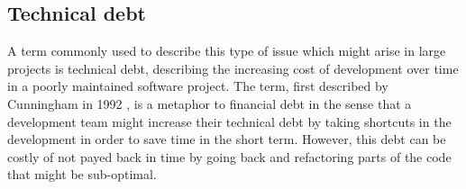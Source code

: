 \subsection{Technical debt}
A term commonly used to describe this type of issue which might arise in large projects is technical debt, describing the increasing cost of development over time in a poorly maintained software project. 
The term, first described by Cunningham in 1992 \cite{cunningham_wycash_1992}, is a metaphor to financial debt in the sense that a development team might increase their technical debt by taking shortcuts in the development in order to save time in the short term.
However, this debt can be costly of not payed back in time by going back and refactoring parts of the code that might be sub-optimal.

